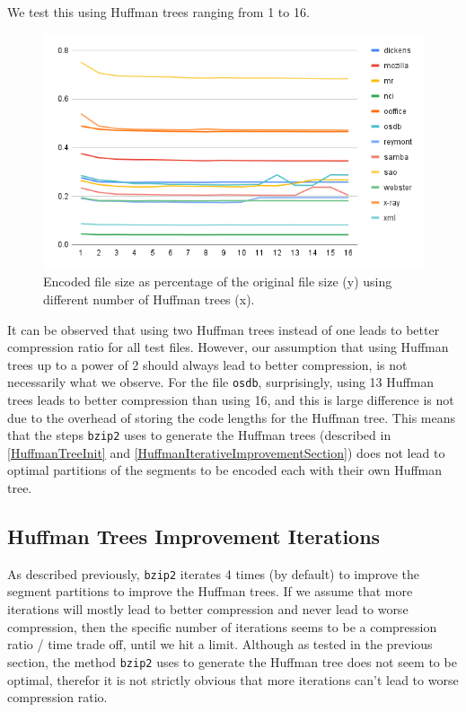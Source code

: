 \documentclass{article}
\begin{document}
We test this using Huffman trees ranging from 1 to 16.
\begin{figure}[H]
    \centering
    \includegraphics[width=\textwidth]{images/HuffmanTreesCount.png}
    \caption{Encoded file size as percentage of the original file size (y) using different number of Huffman trees (x).}
\end{figure}
It can be observed that using two Huffman trees instead of one leads to better compression ratio for all test files.
However, our assumption that using Huffman trees up to a power of 2 should always lead to better compression, is not necessarily what we observe. For the file \texttt{osdb}, surprisingly, using 13 Huffman trees leads to better compression than using 16, and this is large difference is not due to the overhead of storing the code lengths for the Huffman tree.
This means that the steps \texttt{bzip2} uses to generate the Huffman trees (described in \cref{HuffmanTreeInit} and \cref{HuffmanIterativeImprovementSection}) does not lead to optimal partitions of the segments to be encoded each with their own Huffman tree.


\subsection{Huffman Trees Improvement Iterations}
As described previously, \texttt{bzip2} iterates 4 times (by default) to improve the segment partitions to improve the Huffman trees. If we assume that more iterations will mostly lead to better compression and never lead to worse compression, then the specific number of iterations seems to be a compression ratio / time trade off, until we hit a limit.
Although as tested in the previous section, the method \texttt{bzip2} uses to generate the Huffman tree does not seem to be optimal, therefor it is not strictly obvious that more iterations can't lead to worse compression ratio. 
\end{document}
